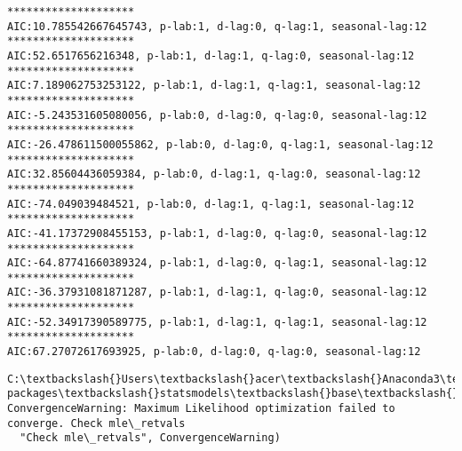 \documentclass[11pt]{article}
\begin{document}
    \begin{Verbatim}[commandchars=\\\{\}]
********************
AIC:10.785542667645743, p-lab:1, d-lag:0, q-lag:1, seasonal-lag:12
********************
AIC:52.6517656216348, p-lab:1, d-lag:1, q-lag:0, seasonal-lag:12
********************
AIC:7.189062753253122, p-lab:1, d-lag:1, q-lag:1, seasonal-lag:12
********************
AIC:-5.243531605080056, p-lab:0, d-lag:0, q-lag:0, seasonal-lag:12
********************
AIC:-26.478611500055862, p-lab:0, d-lag:0, q-lag:1, seasonal-lag:12
********************
AIC:32.85604436059384, p-lab:0, d-lag:1, q-lag:0, seasonal-lag:12
********************
AIC:-74.049039484521, p-lab:0, d-lag:1, q-lag:1, seasonal-lag:12
********************
AIC:-41.17372908455153, p-lab:1, d-lag:0, q-lag:0, seasonal-lag:12
********************
AIC:-64.87741660389324, p-lab:1, d-lag:0, q-lag:1, seasonal-lag:12
********************
AIC:-36.37931081871287, p-lab:1, d-lag:1, q-lag:0, seasonal-lag:12
********************
AIC:-52.34917390589775, p-lab:1, d-lag:1, q-lag:1, seasonal-lag:12
********************
AIC:67.27072617693925, p-lab:0, d-lag:0, q-lag:0, seasonal-lag:12

    \end{Verbatim}

    \begin{Verbatim}[commandchars=\\\{\}]
C:\textbackslash{}Users\textbackslash{}acer\textbackslash{}Anaconda3\textbackslash{}lib\textbackslash{}site-packages\textbackslash{}statsmodels\textbackslash{}base\textbackslash{}model.py:508: ConvergenceWarning: Maximum Likelihood optimization failed to converge. Check mle\_retvals
  "Check mle\_retvals", ConvergenceWarning)

    \end{Verbatim}
\end{document}
